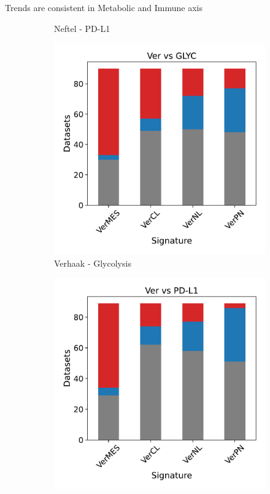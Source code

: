 \documentclass[aspectratio=169,9pt]{beamer}
\begin{document}
\begin{frame}{Trends are consistent in Metabolic and Immune axis}
\begin{adjustwidth}{-5cm}{-5cm}
\begin{figure}
\begin{subfigure}[c]{0.27\textwidth}
                    \caption{Neftel - PD-L1}
                \end{subfigure}
                \pause
                \begin{subfigure}[c]{0.27\textwidth}
                    \centering
                    \includegraphics[width=\textwidth]{Bar_Bulk_Ver-GLYC}
                    \caption{Verhaak - Glycolysis}
                \end{subfigure}
                \begin{subfigure}[c]{0.27\textwidth}
                    \centering
                    \includegraphics[width=\textwidth]{Bar_Bulk_Ver-PD-L1}

\end{subfigure}
\end{figure}
\end{adjustwidth}
\end{frame}
\end{document}
